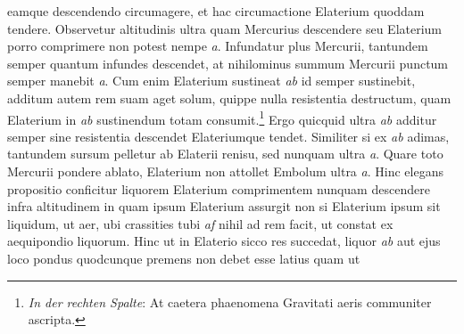                                                 eamque  descendendo circumagere, et hac circumactione Elaterium\protect{} quoddam tendere. Observetur  altitudinis  ultra quam Mercurius\protect{} descendere seu Elaterium\protect{}  porro comprimere non potest nempe \textit{a}.  Infundatur plus Mercurii\protect{}, tantundem semper quantum  infundes descendet,  at nihilominus summum Mercurii\protect{}  punctum semper manebit \textit{a}. Cum enim Elaterium\protect{}  sustineat \textit{ab} id semper  sustinebit, additum autem rem suam aget solum,  quippe nulla resistentia destructum, quam Elaterium\protect{}  in \textit{ab} sustinendum totam consumit.\footnote{\textit{In der rechten Spalte}: At caetera phaenomena Gravitati aeris communiter ascripta.} 
                         Ergo  quicquid ultra \textit{ab} additur semper sine resistentia  descendet Elateriumque\protect{} tendet. Similiter si ex \textit{ab}  adimas, tantundem sursum pelletur ab Elaterii\protect{}  renisu, sed nunquam ultra \textit{a}. Quare toto Mercurii\protect{}  pondere ablato, Elaterium\protect{} non attollet Embolum\protect{}  ultra \textit{a}. Hinc elegans propositio conficitur liquorem Elaterium\protect{} comprimentem nunquam descendere infra  altitudinem in quam ipsum Elaterium\protect{} assurgit  non  si Elaterium\protect{} ipsum sit liquidum, ut aer, ubi crassities  tubi \textit{af} nihil ad rem facit, ut constat ex aequipondio  liquorum. Hinc ut in Elaterio\protect{} sicco res succedat, liquor \textit{ab} aut ejus loco pondus quodcunque  premens non debet  esse latius quam ut    

